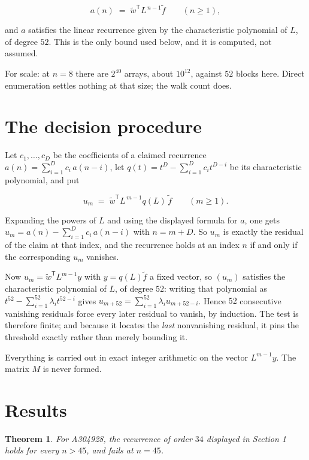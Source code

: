\documentclass[11pt]{article}
\newtheorem{theorem}{Theorem}
\theoremstyle{definition}
\begin{document}
\[a(n) \;=\; \tilde w^{\mathsf T} L^{\,n-1} \tilde f \qquad (n \ge 1),\]

and $a$ satisfies the linear recurrence given by the characteristic polynomial of $L$, of degree $52$. This is the only bound used below, and it is computed, not assumed.

For scale: at $n = 8$ there are $2^{40}$ arrays, about $10^{12}$, against $52$ blocks here. Direct enumeration settles nothing at that size; the walk count does.

\section{The decision procedure}

Let $c_1,\dots,c_D$ be the coefficients of a claimed recurrence $a(n) = \sum_{i=1}^{D} c_i\,a(n-i)$, let $q(t) = t^{D} - \sum_{i=1}^{D} c_i t^{D-i}$ be its characteristic polynomial, and put

\[u_m \;=\; \tilde w^{\mathsf T} L^{\,m-1} q(L)\,\tilde f \qquad (m \ge 1).\]

Expanding the powers of $L$ and using the displayed formula for $a$, one gets $u_m = a(n) - \sum_{i=1}^{D} c_i\,a(n-i)$ with $n = m + D$. So $u_m$ is exactly the residual of the claim at that index, and the recurrence holds at an index $n$ if and only if the corresponding $u_m$ vanishes.

Now $u_m = \tilde w^{\mathsf T} L^{m-1} y$ with $y = q(L)\tilde f$ a fixed vector, so $(u_m)$ satisfies the characteristic polynomial of $L$, of degree $52$: writing that polynomial as $t^{52} - \sum_{i=1}^{52} \lambda_i t^{52-i}$ gives $u_{m+52} = \sum_{i=1}^{52} \lambda_i u_{m+52-i}$. Hence $52$ consecutive vanishing residuals force every later residual to vanish, by induction. The test is therefore finite; and because it locates the {\itshape last} nonvanishing residual, it pins the threshold exactly rather than merely bounding it.

Everything is carried out in exact integer arithmetic on the vector $L^{m-1}y$. The matrix $M$ is never formed.

\section{Results}

\begin{theorem} For A304928, the recurrence of order $34$ displayed in Section 1 holds for every $n > 45$, and fails at $n = 45$.\end{theorem}
\end{document}
